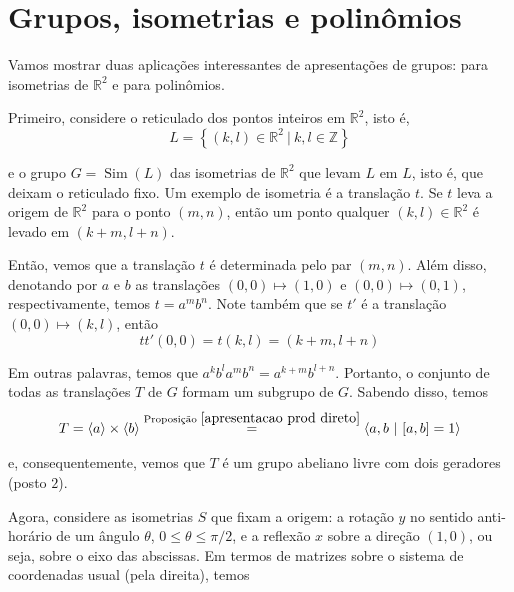 \documentclass[a4paper,portuguese,11pt,twoside, leqno]{book}
\DeclareMathOperator{\Sim}{Sim}
\theoremstyle{definition}
\begin{document}
	\section{Grupos, isometrias e polinômios}
	\hspace{12pt} Vamos mostrar duas aplicações interessantes de apresentações de grupos: para isometrias de $\mathbb{R}^2$ e para polinômios.
	\par\vspace{0.3cm} Primeiro, considere o reticulado dos pontos inteiros em $\mathbb{R}^2$, isto é,
	\begin{equation*}
	L = \left\{ (k,l)\in\mathbb{R}^2 \ | \ k,l\in\mathbb{Z} \right\}
	\end{equation*}
	\par\vspace{0.3cm} e o grupo $G = \Sim(L)$ das isometrias de $\mathbb{R}^2$ que levam $L$ em $L$, isto é, que deixam o reticulado fixo. Um exemplo de isometria é a translação $t$. Se $t$ leva a origem de $\mathbb{R}^2$ para o ponto $(m,n)$, então um ponto qualquer $(k,l)\in\mathbb{R}^2$ é levado em $(k+m, l+n)$.
	\par\vspace{0.3cm} Então, vemos que a translação $t$ é determinada pelo par $(m,n)$. Além disso, denotando por $a$ e $b$ as translações $(0,0)\mapsto (1,0)$ e $(0,0)\mapsto(0,1)$, respectivamente, temos $t = a^mb^n$. Note também que se $t'$ é a translação $(0,0)\mapsto(k,l)$, então 
	\begin{equation*}
	tt'(0,0) = t(k,l) = (k+m, l+n)
	\end{equation*}
	\par\vspace{0.3cm} Em outras palavras, temos que $a^kb^la^mb^n = a^{k+m}b^{l+n}$. Portanto, o conjunto de todas as translações $T$ de $G$ formam um subgrupo de $G$. Sabendo disso, temos
	\begin{equation*}
	T = \langle a \rangle \times \langle b \rangle \stackrel{\text{Proposição }\eqref{apresentacao prod direto}}{=} \langle a,b \ | \ [a,b]=1 \rangle 
	\end{equation*} 
	\par\vspace{0.3cm} e, consequentemente, vemos que $T$ é um grupo abeliano livre com dois geradores (posto $2$).
	\par\vspace{0.3cm} Agora, considere as isometrias $S$ que fixam a origem: a rotação $y$ no sentido anti-horário de um ângulo $\theta$, $0\leq \theta\leq \pi/2$, e a reflexão $x$ sobre a direção $(1,0)$, ou seja, sobre o eixo das abscissas. Em termos de matrizes sobre o sistema de coordenadas usual (pela direita), temos
\end{document}
